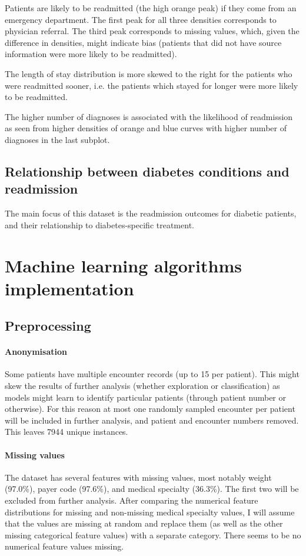 \documentclass[10pt, twocolumn]{article}
\begin{document}
Patients are likely to be readmitted (the high orange peak) if they come from an emergency department. The first peak for all three densities corresponds to physician referral. The third peak corresponds to missing values, which, given the difference in densities, might indicate bias (patients that did not have source information were more likely to be readmitted).

The length of stay distribution is more skewed to the right for the patients who were readmitted sooner, i.e. the patients which stayed for longer were more likely to be readmitted.

The higher number of diagnoses is associated with the likelihood of readmission as seen from higher densities of orange and blue curves with higher number of diagnoses in the last subplot.


\subsection{Relationship between diabetes conditions and readmission}
The main focus of this dataset is the readmission outcomes for diabetic patients, and their relationship to diabetes-specific treatment.

\section{Machine learning algorithms implementation}

\subsection{Preprocessing}

\paragraph{Anonymisation} Some patients have multiple encounter records (up to 15 per patient). This might skew the results of further analysis (whether exploration or classification) as models might learn to identify particular patients (through patient number or otherwise). For this reason at most one randomly sampled encounter per patient will be included in further analysis, and patient and encounter numbers removed. This leaves 7944 unique instances.

\paragraph{Missing values} The dataset has several features with missing values, most notably weight (97.0\%), payer code (97.6\%), and medical specialty (36.3\%). The first two will be excluded from further analysis. After comparing the numerical feature distributions for missing and non-missing medical specialty values, I will assume that the values are missing at random and replace them (as well as the other missing categorical feature values) with a separate category. There seems to be no numerical feature values missing.
\end{document}
